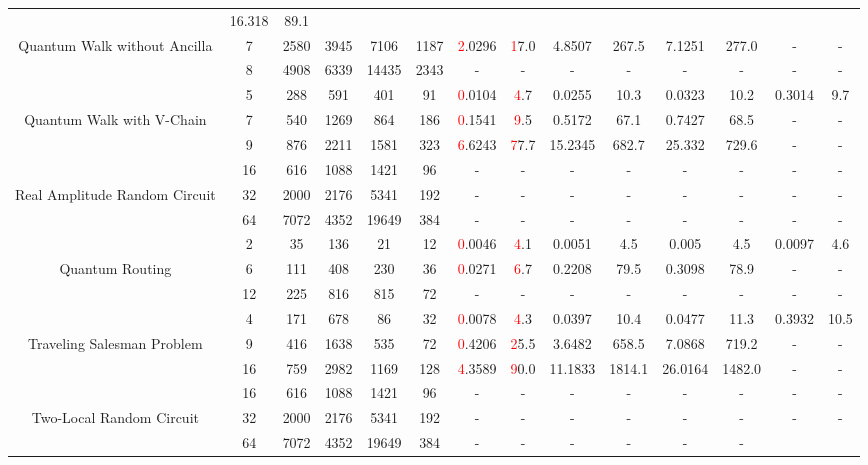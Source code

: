 \begin{table}[htb]
{\begin{tabular}{|c|c|c|c|c|c|c|c|c|c|c|c|c|c|}
 & 16.318 & 89.1
 \\
Quantum Walk without Ancilla & 
7 & 2580 & 3945 & 7106 & 1187
 & \textcolor{red}2.0296 & \textcolor{red}17.0
 & 4.8507 & 267.5
 & 7.1251 & 277.0
 & - & -
 \\
 & 
8 & 4908 & 6339 & 14435 & 2343
 & - & -
 & - & -
 & - & -
 & - & -
 \\
\hline
 & 
5 & 288 & 591 & 401 & 91
 & \textcolor{red}0.0104 & \textcolor{red}4.7
 & 0.0255 & 10.3
 & 0.0323 & 10.2
 & 0.3014 & 9.7
 \\
Quantum Walk with V-Chain & 
7 & 540 & 1269 & 864 & 186
 & \textcolor{red}0.1541 & \textcolor{red}9.5
 & 0.5172 & 67.1
 & 0.7427 & 68.5
 & - & -
 \\
 & 
9 & 876 & 2211 & 1581 & 323
 & \textcolor{red}6.6243 & \textcolor{red}77.7
 & 15.2345 & 682.7
 & 25.332 & 729.6
 & - & -
 \\
\hline
 & 
16 & 616 & 1088 & 1421 & 96
 & - & -
 & - & -
 & - & -
 & - & -
 \\
Real Amplitude Random Circuit & 
32 & 2000 & 2176 & 5341 & 192
 & - & -
 & - & -
 & - & -
 & - & -
 \\
 & 
64 & 7072 & 4352 & 19649 & 384
 & - & -
 & - & -
 & - & -
 & - & -
 \\
\hline
 & 
2 & 35 & 136 & 21 & 12
 & \textcolor{red}0.0046 & \textcolor{red}4.1
 & 0.0051 & 4.5
 & 0.005 & 4.5
 & 0.0097 & 4.6
 \\
Quantum Routing & 
6 & 111 & 408 & 230 & 36
 & \textcolor{red}0.0271 & \textcolor{red}6.7
 & 0.2208 & 79.5
 & 0.3098 & 78.9
 & - & -
 \\
 & 
12 & 225 & 816 & 815 & 72
 & - & -
 & - & -
 & - & -
 & - & -
 \\
\hline
 & 
4 & 171 & 678 & 86 & 32
 & \textcolor{red}0.0078 & \textcolor{red}4.3
 & 0.0397 & 10.4
 & 0.0477 & 11.3
 & 0.3932 & 10.5
 \\
Traveling Salesman Problem & 
9 & 416 & 1638 & 535 & 72
 & \textcolor{red}0.4206 & \textcolor{red}25.5
 & 3.6482 & 658.5
 & 7.0868 & 719.2
 & - & -
 \\
 & 
16 & 759 & 2982 & 1169 & 128
 & \textcolor{red}4.3589 & \textcolor{red}90.0
 & 11.1833 & 1814.1
 & 26.0164 & 1482.0
 & - & -
 \\
\hline
 & 
16 & 616 & 1088 & 1421 & 96
 & - & -
 & - & -
 & - & -
 & - & -
 \\
Two-Local Random Circuit & 
32 & 2000 & 2176 & 5341 & 192
 & - & -
 & - & -
 & - & -
 & - & -
 \\
 & 
64 & 7072 & 4352 & 19649 & 384
 & - & -
 & - & -
 & - & -

\end{tabular}}
\end{table}

